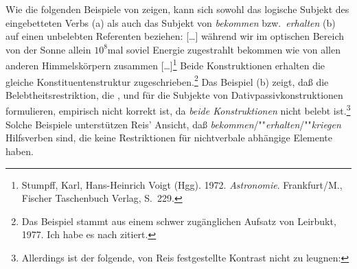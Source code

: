 Wie die folgenden Beispiele von \citet[]{Leirbukt87} zeigen,
kann sich sowohl das logische Subjekt des eingebetteten Verbs (a)
als auch das Subjekt von \emph{bekommen} bzw.\ \emph{erhalten} (b) auf einen unbelebten Referenten beziehen:
\eal
\label{ex-zustrahlen-zuschreiben}
\ex{}
{}[\ldots] während wir im     optischen Bereich von  der Sonne allein $10^8$mal    soviel  Energie zugestrahlt
     bekommen wie von  allen anderen Himmelskörpern zusammen [\ldots]\footnote{
        Stumpff, Karl, Hans-Heinrich Voigt (Hgg). 1972.
        \emph{Astronomie}. Frankfurt/M., Fischer Taschenbuch Verlag, S.\, 229.%
}
\ex 
Beide Konstruktionen erhalten die gleiche Konstituentenstruktur zugeschrieben.\footnote{
        Das Beispiel stammt aus einem schwer zugänglichen Aufsatz von
        Leirbukt, 1977. Ich habe es nach  zitiert.%
}
\zl
Das Beispiel (b) zeigt, daß die Belebtheitsrestriktion, 
die \citet[]{Reis76a}, \citet[]{Wegener86a} 
und \citet[]{Olsen97c} für die Subjekte von Dativpassivkonstruktionen formulieren,
empirisch nicht korrekt ist, da \emph{beide Konstruktionen} nicht belebt ist.\footnote{
        Allerdings ist der folgende, von Reis festgestellte Kontrast nicht zu leugnen:
        \eal
        \zllast
}
Solche Beispiele unterstützen Reis' Ansicht, daß \emph{bekommen}/""\emph{erhalten}/""\emph{kriegen} 
Hilfsverben sind, die keine Restriktionen für nichtverbale abhängige Elemente haben.


